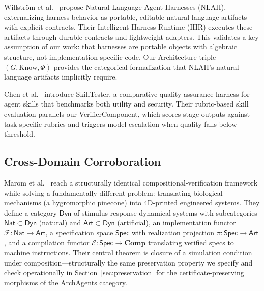 Willstr{\"o}m et al.~\cite{willstro2026nlah} propose Natural-Language Agent Harnesses (NLAH), externalizing harness behavior as portable, editable natural-language artifacts with explicit contracts. Their Intelligent Harness Runtime (IHR) executes these artifacts through durable contracts and lightweight adapters. This validates a key assumption of our work: that harnesses are portable objects with algebraic structure, not implementation-specific code. Our Architecture triple $(G, \mathrm{Know}, \Phi)$ provides the categorical formalization that NLAH's natural-language artifacts implicitly require.

Chen et al.~\cite{chen2026skilltester} introduce SkillTester, a comparative quality-assurance harness for agent skills that benchmarks both utility and security. Their rubric-based skill evaluation parallels our VerifierComponent, which scores stage outputs against task-specific rubrics and triggers model escalation when quality falls below threshold.

\subsection{Cross-Domain Corroboration}

Marom et al.~\cite{marom2026category} reach a structurally identical compositional-verification framework while solving a fundamentally different problem: translating biological mechanisms (a hygromorphic pinecone) into 4D-printed engineered systems. They define a category $\mathsf{Dyn}$ of stimulus-response dynamical systems with subcategories $\mathsf{Nat}\subset\mathsf{Dyn}$ (natural) and $\mathsf{Art}\subset\mathsf{Dyn}$ (artificial), an implementation functor $\mathcal{F}\colon\mathsf{Nat}\to\mathsf{Art}$, a specification space $\mathsf{Spec}$ with realization projection $\pi\colon\mathsf{Spec}\to\mathsf{Art}$, and a compilation functor $\mathcal{E}\colon\mathsf{Spec}\to\mathbf{Comp}$ translating verified specs to machine instructions. Their central theorem is closure of a simulation condition under composition---structurally the same preservation property we specify and check operationally in Section~\ref{sec:preservation} for the certificate-preserving morphisms of the ArchAgents category.


